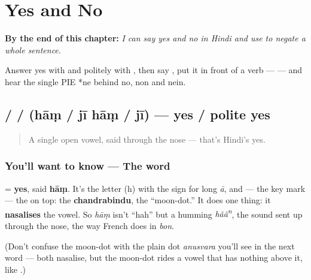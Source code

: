 
\chapter{Yes and No}
\label{ch:hi-yes-and-no}

\begin{chapteropening}
\textbf{By the end of this chapter:} \emph{I can say yes and no in Hindi and use  to negate a whole sentence.}

Answer yes with  and politely with  , then say , put it in front of a verb —    — and hear the single PIE *ne behind no, non and nein.
\end{chapteropening}

\section[\texorpdfstring{\hi{हाँ} / \hi{जी} \hi{हाँ} / \hi{जी} (hāṃ)}{हाँ / जी हाँ / जी (hāṃ)}]{ /   /  (hāṃ / jī hāṃ / jī) — yes / polite yes}

\label{lesson:HI-C07-haan}



\begin{quote}
A single open vowel, said through the nose — that's Hindi's yes.
\end{quote}

\subsection*{You'll want to know — The word}
\textbf{} = \textbf{yes}, said \textbf{hāṃ}. It's the letter \textbf{} (h) with the \textbf{} sign for long \emph{ā}, and — the key mark — the \textbf{} on top: the \textbf{chandrabindu}, the \textquotedblleft{}moon-dot.\textquotedblright{} It does one thing: it \textbf{nasalises} the vowel. So \emph{hāṃ} isn't \textquotedblleft{}hah\textquotedblright{} but a humming \emph{hãã\textsuperscript{n}}, the sound sent up through the nose, the way French does in \emph{bon}.

(Don't confuse the moon-dot \textbf{} with the plain dot \textbf{} \emph{anusvara} you'll see in the next word — both nasalise, but the moon-dot rides a vowel that has nothing above it, like \emph{}.)

